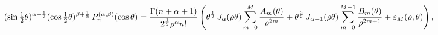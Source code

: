 \[(\mathop{\sin\/}\nolimits\tfrac{1}{2}\theta)^{\alpha+\frac{1}{2}}(\mathop{\cos%
\/}\nolimits\tfrac{1}{2}\theta)^{\beta+\frac{1}{2}}\mathop{P^{(\alpha,\beta)}_%
{n}\/}\nolimits\!\left(\mathop{\cos\/}\nolimits\theta\right)=\frac{\mathop{%
\Gamma\/}\nolimits\!\left(n+\alpha+1\right)}{2^{\frac{1}{2}}\rho^{\alpha}n!}\*%
\left(\theta^{\frac{1}{2}}\mathop{J_{\alpha}\/}\nolimits\!\left(\rho\theta%
\right)\sum_{m=0}^{M}\dfrac{A_{m}(\theta)}{\rho^{2m}}+\theta^{\frac{3}{2}}%
\mathop{J_{\alpha+1}\/}\nolimits\!\left(\rho\theta\right)\sum_{m=0}^{M-1}%
\dfrac{B_{m}(\theta)}{\rho^{2m+1}}+\varepsilon_{M}(\rho,\theta)\right),\]